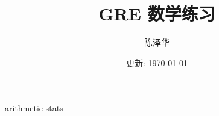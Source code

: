 \documentclass{report}
\title{GRE 数学练习}
\author{陈泽华}
\date{更新: \today}
\begin{document}
  \maketitle
  \tableofcontents

  {arithmetic}
  {stats}
\end{document}

